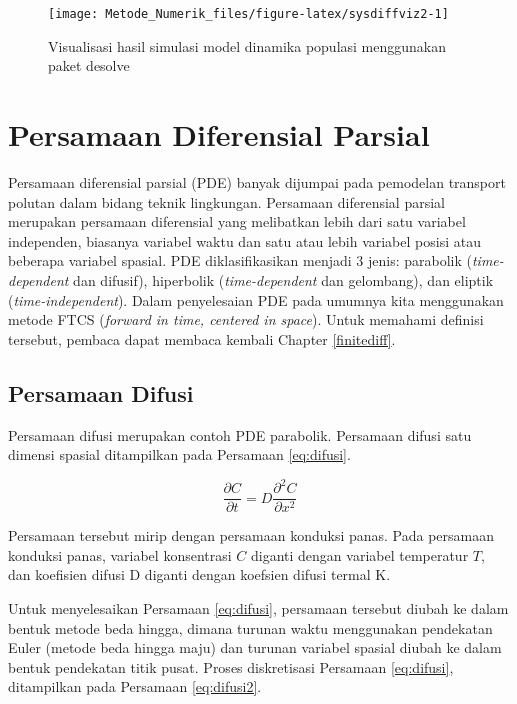 \documentclass[
]{book}
\theoremstyle{definition}
\theoremstyle{definition}
\theoremstyle{definition}
\theoremstyle{definition}
\theoremstyle{remark}
\begin{document}
\begin{figure}

{\centering \texttt{[image: Metode\_Numerik\_files/figure-latex/sysdiffviz2-1]} 

}

\caption{Visualisasi hasil simulasi model dinamika populasi menggunakan paket desolve}\label{fig:sysdiffviz2}
\end{figure}

\hypertarget{pasialdiff}{%
\section{Persamaan Diferensial Parsial}\label{pasialdiff}}

Persamaan diferensial parsial (PDE) banyak dijumpai pada pemodelan transport polutan dalam bidang teknik lingkungan. Persamaan diferensial parsial merupakan persamaan diferensial yang melibatkan lebih dari satu variabel independen, biasanya variabel waktu dan satu atau lebih variabel posisi atau beberapa variabel spasial. PDE diklasifikasikan menjadi 3 jenis: parabolik (\emph{time-dependent} dan difusif), hiperbolik (\emph{time-dependent} dan gelombang), dan eliptik (\emph{time-independent}). Dalam penyelesaian PDE pada umumnya kita menggunakan metode FTCS (\emph{forward in time, centered in space}). Untuk memahami definisi tersebut, pembaca dapat membaca kembali Chapter \ref{finitediff}.

\hypertarget{persamaan-difusi}{%
\subsection{Persamaan Difusi}\label{persamaan-difusi}}

Persamaan difusi merupakan contoh PDE parabolik. Persamaan difusi satu dimensi spasial ditampilkan pada Persamaan \eqref{eq:difusi}.

\begin{equation}
\frac{\partial C}{\partial t}=D\frac{\partial^2C}{\partial x^2}
  \label{eq:difusi}
\end{equation}

Persamaan tersebut mirip dengan persamaan konduksi panas. Pada persamaan konduksi panas, variabel konsentrasi \(C\) diganti dengan variabel temperatur \(T\), dan koefisien difusi D diganti dengan koefsien difusi termal K.

Untuk menyelesaikan Persamaan \eqref{eq:difusi}, persamaan tersebut diubah ke dalam bentuk metode beda hingga, dimana turunan waktu menggunakan pendekatan Euler (metode beda hingga maju) dan turunan variabel spasial diubah ke dalam bentuk pendekatan titik pusat. Proses diskretisasi Persamaan \eqref{eq:difusi}, ditampilkan pada Persamaan \eqref{eq:difusi2}.
\end{document}
